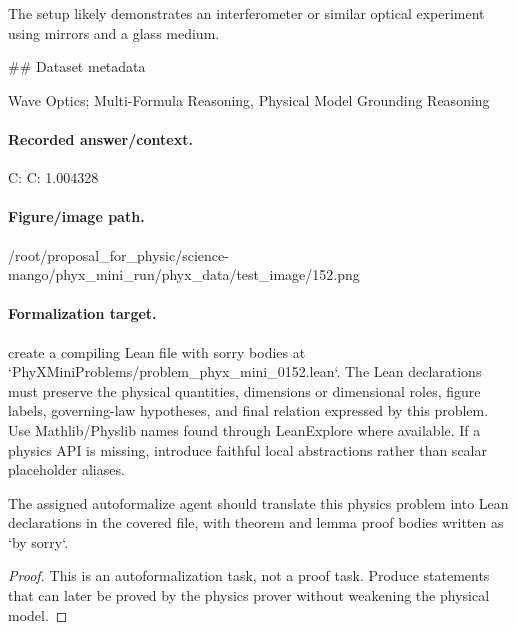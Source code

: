 The setup likely demonstrates an interferometer or similar optical experiment using mirrors and a glass medium.

\#\# Dataset metadata

Wave Optics; Multi-Formula Reasoning, Physical Model Grounding Reasoning

\paragraph{Recorded answer/context.}
C: C: 1.004328

\paragraph{Figure/image path.}
/root/proposal\_for\_physic/science-mango/phyx\_mini\_run/phyx\_data/test\_image/152.png

\paragraph{Formalization target.}
create a compiling Lean file with sorry bodies at `PhyXMiniProblems/problem\_phyx\_mini\_0152.lean`. The Lean declarations must preserve the physical quantities, dimensions or dimensional roles, figure labels, governing-law hypotheses, and final relation expressed by this problem.
Use Mathlib/Physlib names found through LeanExplore where available. If a physics API is missing, introduce faithful local abstractions rather than scalar placeholder aliases.

\begin{theorem}
\label{thm:physics:phyx_mini_0152:target}
The assigned autoformalize agent should translate this physics problem into Lean declarations in the covered file, with theorem and lemma proof bodies written as `by sorry`.
\end{theorem}
\begin{proof}
This is an autoformalization task, not a proof task. Produce statements that can later be proved by the physics prover without weakening the physical model.
\end{proof}

